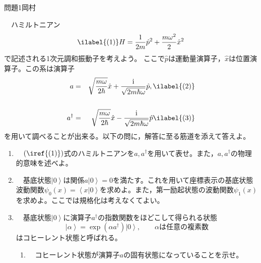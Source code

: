 \documentclass[fleqn]{jbook}
\begin{document}

\begin{question}{問題1}{岡村}
\setcounter{equation}{0}

　ハミルトニアン
\begin{eqnarray}\ilabel{(1)}
H = \frac{1}{{2m}}\hat p^2  + \frac{{m\omega ^2 }}{2}\hat x^2 
\end{eqnarray}
で記述される1次元調和振動子を考えよう。
ここで$\hat p$は運動量演算子，$\hat x$は位置演算子。この系は演算子
\begin{eqnarray}
  a &=& \sqrt {\frac{{m\omega }}{{2\hbar }}} \hat x + \frac{{\rm i}}{{\sqrt {2m\hbar \omega } }}\hat p , \ilabel{(2)}\\ 
  & & \cr
  a^{\dagger}  &=& \sqrt {\frac{{m\omega }}{{2\hbar }}} \hat x - \frac{{\rm i}}{{\sqrt {2m\hbar \omega } }}\hat p \ilabel{(3)}
\end{eqnarray}
を用いて調べることが出来る。以下の問に，解答に至る筋道を添えて答えよ。\\

\begin{enumerate}
  \item 　$(\iref{(1)})$式のハミルトニアンを$a,a^{\dagger}$を用いて表せ。また，$a,a^{\dagger}$の物理的意味を述べよ。\\
  
  \item 　基底状態$\left| 0 \right\rangle$は関係$a\left| 0 \right\rangle = 0$を満たす。これを用いて座標表示の基底状態波動関数$\psi _0 \left( x \right)=\left\langle {x}|{0} \right\rangle $を求めよ。また，第一励起状態の波動関数$\psi _1 \left( x \right)$を求めよ。ここでは規格化は考えなくてよい。\\
  
  \item 　基底状態$\left| 0 \right\rangle$に演算子$a^{\dagger}$の指数関数をほどこして得られる状態
  \begin{equation}
\left| \alpha  \right\rangle  = \exp \left( {\alpha a^{\dagger} } \right)\left| 0 \right\rangle ,\qquad \alpha は任意の複素数
  \end{equation}
  はコヒーレント状態と呼ばれる。\\
  
  \begin{enumerate}
    \item 　コヒーレント状態が演算子$a$の固有状態になっていることを示せ。\\
    

\end{enumerate}
\end{enumerate}
\end{question}
\end{document}
